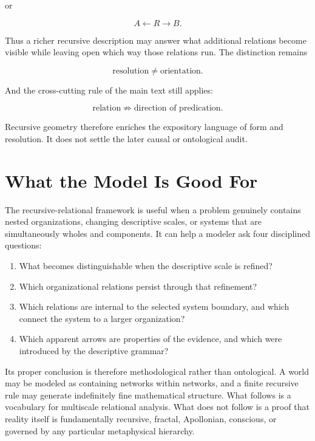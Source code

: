 or

\[
A\longleftarrow R\longrightarrow B.
\]

Thus a richer recursive description may answer what additional relations become visible while leaving open which way those relations run. The distinction remains

\[
\text{resolution}\neq\text{orientation}.
\]

And the cross-cutting rule of the main text still applies:

\[
\text{relation}\not\Rightarrow\text{direction of predication}.
\]

Recursive geometry therefore enriches the expository language of form and resolution. It does not settle the later causal or ontological audit.

\section{What the Model Is Good For}

The recursive-relational framework is useful when a problem genuinely contains nested organizations, changing descriptive scales, or systems that are simultaneously wholes and components. It can help a modeler ask four disciplined questions:

\begin{enumerate}[label=\arabic*.]
\item What becomes distinguishable when the descriptive scale is refined?
\item Which organizational relations persist through that refinement?
\item Which relations are internal to the selected system boundary, and which connect the system to a larger organization?
\item Which apparent arrows are properties of the evidence, and which were introduced by the descriptive grammar?
\end{enumerate}

Its proper conclusion is therefore methodological rather than ontological. A world may be modeled as containing networks within networks, and a finite recursive rule may generate indefinitely fine mathematical structure. What follows is a vocabulary for multiscale relational analysis. What does not follow is a proof that reality itself is fundamentally recursive, fractal, Apollonian, conscious, or governed by any particular metaphysical hierarchy.
